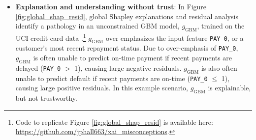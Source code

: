 \documentclass[fleqn]{article}
\begin{document}
\begin{itemize}

\item \textbf{Explanation and understanding without trust}: In Figure \ref{fig:global_shap_resid}, global Shapley explanations and residual analysis identify a pathology in an unconstrained GBM model, $g_{\text{GBM}}$, trained on the UCI credit card data \cite{uci}.\footnote{Code to replicate Figure \ref{fig:global_shap_resid} is available here: \url{https://github.com/jphall663/xai_misconceptions}.} $g_{\text{GBM}}$ over emphasizes the input feature \texttt{PAY\_0}, or a customer's most recent repayment status. Due to over-emphasis of \texttt{PAY\_0}, $g_{\text{GBM}}$ is often unable to predict on-time payment if recent payments are delayed (\texttt{PAY\_0} $>$ 1), causing large negative residuals. $g_{\text{GBM}}$ is also often unable to predict default if recent payments are on-time (\texttt{PAY\_0} $\leq$ 1), causing large positive residuals. In this example scenario, $g_{\text{GBM}}$ is explainable, but not trustworthy. 


\end{itemize}
\end{document}
